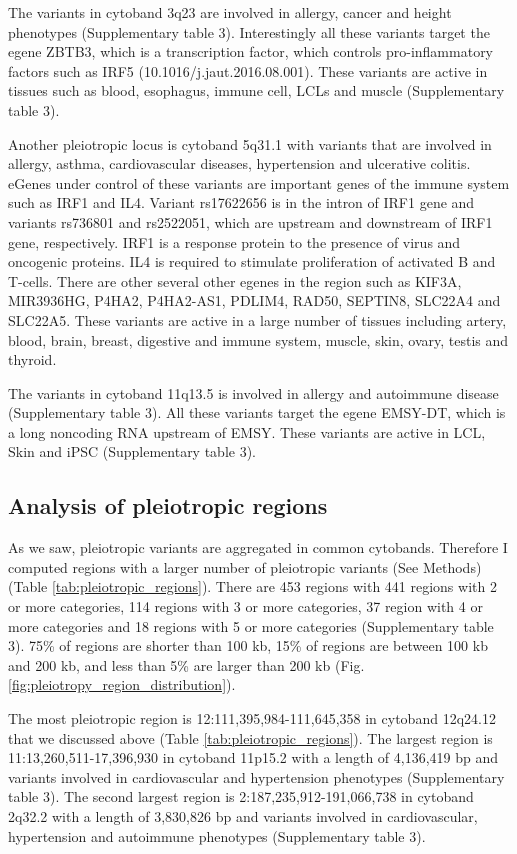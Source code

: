 The variants in cytoband 3q23 are involved in allergy, cancer and height phenotypes (Supplementary table 3).
%
Interestingly all these variants target the egene ZBTB3, which is a transcription factor, which controls pro-inflammatory factors such as IRF5 (10.1016/j.jaut.2016.08.001).
%
These variants are active in tissues such as blood, esophagus, immune cell, LCLs and muscle (Supplementary table 3).

Another pleiotropic locus is cytoband 5q31.1 with variants that are involved in allergy, asthma, cardiovascular diseases, hypertension and ulcerative colitis.
%
eGenes under control of these variants are important genes of the immune system such as IRF1 and IL4.
%
Variant rs17622656 is in the intron of IRF1 gene and variants rs736801 and rs2522051, which are upstream and downstream of IRF1 gene, respectively.
%
IRF1 is a response protein to the presence of virus and oncogenic proteins.
%
IL4 is required to stimulate proliferation of activated B and T-cells.
%
There are other several other egenes in the region such as KIF3A, MIR3936HG, P4HA2, P4HA2-AS1, PDLIM4, RAD50, SEPTIN8, SLC22A4 and SLC22A5.
%
These variants are active in a large number of tissues including artery, blood, brain, breast, digestive and immune system, muscle, skin, ovary, testis and thyroid.

The variants in cytoband 11q13.5 is involved in allergy and autoimmune disease (Supplementary table 3).
%
All these variants target the egene EMSY-DT, which is a long noncoding RNA upstream of EMSY.
%
These variants are active in LCL, Skin and iPSC (Supplementary table 3).

\subsection*{Analysis of pleiotropic regions}

As we saw, pleiotropic variants are aggregated in common cytobands.
%
Therefore I computed regions with a larger number of pleiotropic variants (See Methods) (Table \ref{tab:pleiotropic_regions}).
%
There are 453 regions with 441 regions with 2 or more categories, 114 regions with 3 or more categories, 37 region with 4 or more categories and 18 regions with 5 or more categories (Supplementary table 3).
%
75\% of regions are shorter than 100 kb, 15\% of regions are between 100 kb and 200 kb, and less than 5\% are larger than 200 kb (Fig. \ref{fig:pleiotropy_region_distribution}).

The most pleiotropic region is 12:111,395,984-111,645,358 in cytoband 12q24.12 that we discussed above (Table \ref{tab:pleiotropic_regions}).
%
The largest region is 11:13,260,511-17,396,930 in cytoband 11p15.2 with a length of 4,136,419 bp and variants involved in cardiovascular and hypertension phenotypes (Supplementary table 3).
%
The second largest region is 2:187,235,912-191,066,738 in cytoband 2q32.2 with a length of 3,830,826 bp and variants involved in cardiovascular, hypertension and autoimmune phenotypes  (Supplementary table 3).

